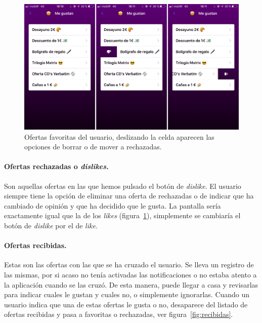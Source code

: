 \begin{figure}[tbp]
\centering
\includegraphics[scale=0.2]{figures/megustan.png}
\caption{Ofertas favoritas del usuario, deslizando la celda aparecen las opciones de borrar o de mover a rechazadas.\label{fig:megustan}}
\end{figure}

\paragraph{Ofertas rechazadas o \textit{dislikes}.} Son aquellas ofertas en las que hemos pulsado el botón de \textit{dislike}. El usuario siempre tiene la opción de eliminar una oferta de rechazadas o de indicar que ha cambiado de opinión y que ha decidido que le gusta. La pantalla sería exactamente igual que la de los \textit{likes} (figura~\ref{fig:megustan}), simplemente se cambiaría el botón de \textit{dislike} por el de \textit{like}.

\paragraph{Ofertas recibidas.\label{item:recibidas}} Estas son las ofertas con las que se ha cruzado el usuario. Se lleva un registro de las mismas, por si acaso no tenía activadas las notificaciones o no estaba atento a la aplicación cuando se las cruzó. De esta manera, puede llegar a casa y revisarlas para indicar cuales le gustan y cuales no, o simplemente ignorarlas. Cuando un usuario indica que una de estas ofertas le gusta o no, desaparece del listado de ofertas recibidas y pasa a favoritas o rechazadas, ver figura~\ref{fig:recibidas}.

